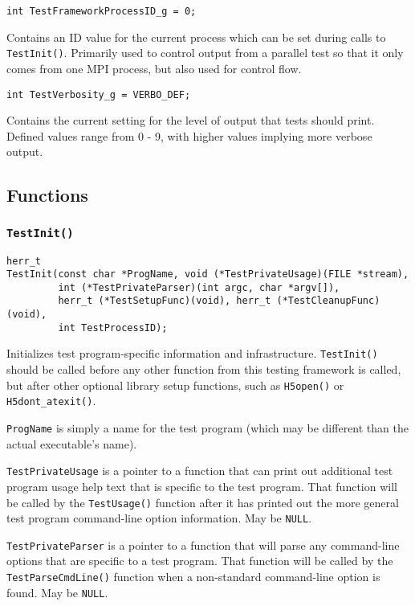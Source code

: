 \documentclass[../HDF5_RFC.tex]{subfiles}
\begin{document}
\begin{verbatim}
int TestFrameworkProcessID_g = 0;
\end{verbatim}

Contains an ID value for the current process which can be set during calls to \texttt{TestInit()}.
Primarily used to control output from a parallel test so that it only comes from one MPI process,
but also used for control flow.

\begin{verbatim}
int TestVerbosity_g = VERBO_DEF;
\end{verbatim}

Contains the current setting for the level of output that tests should print. Defined values range
from 0 - 9, with higher values implying more verbose output.

\subsection{Functions}

\subsubsection{\texttt{TestInit()}}
\label{apdx:testframe_testinit}

\begin{verbatim}
herr_t
TestInit(const char *ProgName, void (*TestPrivateUsage)(FILE *stream),
         int (*TestPrivateParser)(int argc, char *argv[]),
         herr_t (*TestSetupFunc)(void), herr_t (*TestCleanupFunc)(void),
         int TestProcessID);
\end{verbatim}

Initializes test program-specific information and infrastructure. \texttt{TestInit()} should be
called before any other function from this testing framework is called, but after other optional
library setup functions, such as \texttt{H5open()} or \texttt{H5dont\_atexit()}.

\texttt{ProgName} is simply a name for the test program (which may be different than the actual
executable's name).

\texttt{TestPrivateUsage} is a pointer to a function that can print out additional test program usage
help text that is specific to the test program. That function will be called by the \texttt{TestUsage()}
function after it has printed out the more general test program command-line option information. May
be \texttt{NULL}.

\texttt{TestPrivateParser} is a pointer to a function that will parse any command-line options that are
specific to a test program. That function will be called by the \texttt{TestParseCmdLine()} function when
a non-standard command-line option is found. May be \texttt{NULL}.
\end{document}

